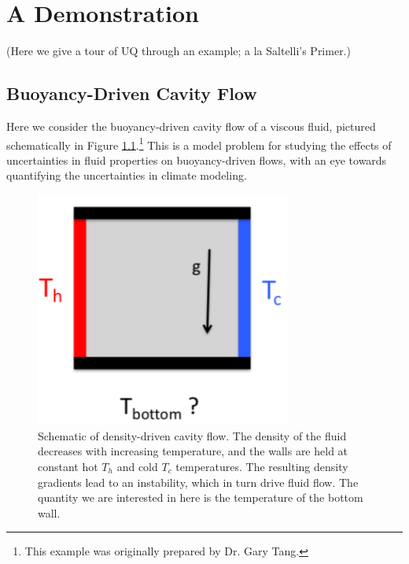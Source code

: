 \documentclass[../primer.tex]{subfiles}
\begin{document}
\chapter{A Demonstration}
(Here we give a tour of UQ through an example; a la Saltelli's Primer.)

\section{Buoyancy-Driven Cavity Flow}
Here we consider the buoyancy-driven cavity flow of a viscous fluid, pictured
schematically in Figure \ref{fig:cavity-schematic}.\footnote{This example was
  originally prepared by Dr. Gary Tang.} This is a model problem for studying
the effects of uncertainties in fluid properties on buoyancy-driven flows, with
an eye towards quantifying the uncertainties in climate modeling.

\begin{figure}[!ht]
  \includegraphics[width=0.75\textwidth]{./images/cavity_schematic}
  \caption{Schematic of density-driven cavity flow. The density of the fluid
    decreases with increasing temperature, and the walls are held at constant
    hot $T_h$ and cold $T_c$ temperatures. The resulting density gradients lead
    to an instability, which in turn drive fluid flow. The quantity we are
    interested in here is the temperature of the bottom wall.}
  \label{fig:cavity-schematic}
\end{figure}
\end{document}
